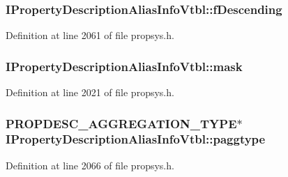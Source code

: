 \subsubsection[{\texorpdfstring{f\+Descending}{fDescending}}]{ I\+Property\+Description\+Alias\+Info\+Vtbl\+::f\+Descending}\hypertarget{struct_i_property_description_alias_info_vtbl_a5b73e3a8ab10a1240a0f328b63aa3ef9}{}\label{struct_i_property_description_alias_info_vtbl_a5b73e3a8ab10a1240a0f328b63aa3ef9}


Definition at line 2061 of file propsys.\+h.

\subsubsection[{\texorpdfstring{mask}{mask}}]{ I\+Property\+Description\+Alias\+Info\+Vtbl\+::mask}\hypertarget{struct_i_property_description_alias_info_vtbl_a2a4c73f3246888f3d323a86c34424fb9}{}\label{struct_i_property_description_alias_info_vtbl_a2a4c73f3246888f3d323a86c34424fb9}


Definition at line 2021 of file propsys.\+h.

\subsubsection[{\texorpdfstring{paggtype}{paggtype}}]{ {\bf P\+R\+O\+P\+D\+E\+S\+C\+\_\+\+A\+G\+G\+R\+E\+G\+A\+T\+I\+O\+N\+\_\+\+T\+Y\+PE}$\ast$ I\+Property\+Description\+Alias\+Info\+Vtbl\+::paggtype}\hypertarget{struct_i_property_description_alias_info_vtbl_ae79379a50b2c4fa6d34f0d7d0f59b565}{}\label{struct_i_property_description_alias_info_vtbl_ae79379a50b2c4fa6d34f0d7d0f59b565}


Definition at line 2066 of file propsys.\+h.

